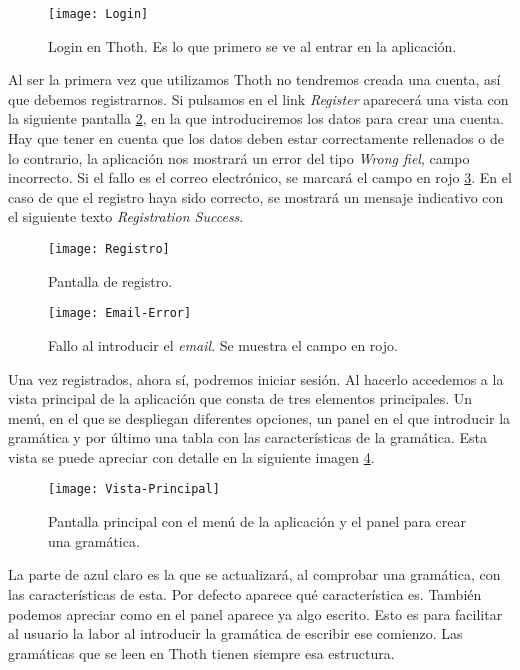 \begin{figure}[h]
\centering
\texttt{[image: Login]}
\caption{Login en Thoth. Es lo que primero se ve al entrar en la aplicación.}
\label{fig:6.1}
\end{figure}

Al ser la primera vez que utilizamos Thoth no tendremos creada una cuenta, así que debemos registrarnos. Si pulsamos en el link \emph{Register} aparecerá una vista con la siguiente pantalla \ref{fig:6.2}, en la que introduciremos los datos para crear una cuenta. Hay que tener en cuenta que los datos deben estar correctamente rellenados o de lo contrario, la aplicación nos mostrará un error del tipo \emph{Wrong fiel}, campo incorrecto. Si el fallo es el correo electrónico, se marcará el campo en rojo \ref{fig:6.3}. En el caso de que el registro haya sido correcto, se mostrará un mensaje indicativo con el siguiente texto \emph{Registration Success}.

\begin{figure}[h]
\centering
\texttt{[image: Registro]}
\caption{Pantalla de registro.}
\label{fig:6.2}
\end{figure}

\begin{figure}[h]
\centering
\texttt{[image: Email-Error]}
\caption{Fallo al introducir el \emph{email}. Se muestra el campo en rojo.}
\label{fig:6.3}
\end{figure}

Una vez registrados, ahora sí, podremos iniciar sesión. Al hacerlo accedemos a la vista principal de la aplicación que consta de tres elementos principales. Un menú, en el que se despliegan diferentes opciones, un panel en el que introducir la gramática y por último una tabla con las características de la gramática. Esta vista se puede apreciar con detalle en la siguiente imagen \ref{fig:6.4}.


\begin{figure}[h]
\centering
\texttt{[image: Vista-Principal]}
\caption{Pantalla principal con el menú de la aplicación y el panel para crear una gramática.}
\label{fig:6.4}
\end{figure}

La parte de azul claro es la que se actualizará, al comprobar una gramática, con las características de esta. Por defecto aparece qué característica es. También podemos apreciar como en el panel aparece ya algo escrito. Esto es para facilitar al usuario la labor al introducir la gramática de escribir ese comienzo. Las gramáticas que se leen en Thoth tienen siempre esa estructura. 

